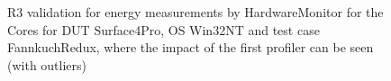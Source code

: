\begin{figure}
                            \caption{R3 validation for energy measurements by HardwareMonitor for the Cores for DUT Surface4Pro, OS Win32NT and test case FannkuchRedux, where the impact of the first profiler can be seen (with outliers)} \label{fig:Surface4Pro_HardwareMonitor_Cores_R3_energy_with_outliers_Win32NT_avg_watts}
                            \end{figure}
                            